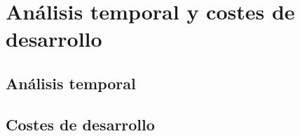 \chapter{An\'alisis temporal y costes de desarrollo}\label{anatemporal}

\section{An\'alisis temporal}
	
\section{Costes de desarrollo}		
	

	